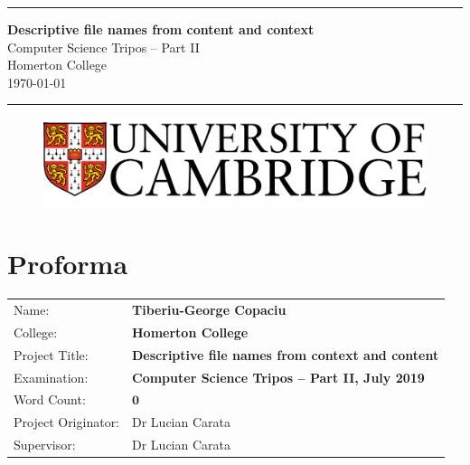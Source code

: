 \documentclass[12pt,a4paper,twoside,openright]{report}
\newcommand{\HRulee}{\rule{\linewidth}{0.5mm}}
\begin{document}




\pagestyle{empty}


\vspace*{60mm}
\HRulee
\begin{center}

  \Huge
  \textbf{Descriptive file names from content and context} \\[5mm]
  Computer Science Tripos -- Part II \\[5mm]
  Homerton College \\[5mm]
  \today  %
\end{center}
\HRulee
\vspace*{30mm}
\begin{figure}[H]
  \centering
  \includegraphics{Images/logo.png}
\end{figure}


\pagestyle{plain}

\chapter*{Proforma}

{\large
  \begin{tabular}{ll}
    Name:               & \bf Tiberiu-George Copaciu                          \\
    College:            & \bf Homerton College                                \\
    Project Title:      & \bf Descriptive file names from context and content \\
    Examination:        & \bf Computer Science Tripos -- Part II, July 2019   \\
    Word Count:         & \bf $\mathbf{0}$\footnotemark[1]                    \\
    Project Originator: & Dr Lucian Carata                                    \\
    Supervisor:         & Dr Lucian Carata                                    \\
  \end{tabular}
}
\end{document}
